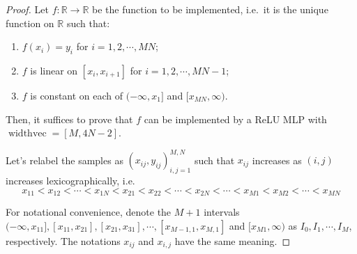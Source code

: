 \documentclass{article}
\numberwithin{equation}{section}
\theoremstyle{definition}
\begin{document}
\begin{proof}

Let $f:\mathbb{R}\rightarrow\mathbb{R}$ be the function to be implemented, i.e.\ it is the unique function on $\mathbb{R}$ such that:
\begin{enumerate}
    \item $f(x_i)=y_i$ for $i=1,2,\cdots,MN$;
    \item $f$ is linear on $[x_i,x_{i+1}]$ for $i=1,2,\cdots,MN-1$;
    \item $f$ is constant on each of $(-\infty,x_1]$ and $[x_{MN},\infty)$.
\end{enumerate}
Then, it suffices to prove that $f$ can be implemented by a ReLU MLP with $\operatorname{widthvec}=[M,4N-2]$.

Let's relabel the samples as $(x_{ij},y_{ij})_{i,j=1}^{M,N}$ such that $x_{ij}$ increases as $(i,j)$ increases lexicographically, i.e. 
\[
    x_{11} < x_{12} < \cdots < x_{1N}
    < 
    x_{21} < x_{22} < \cdots < x_{2N}
    < \cdots < 
    x_{M1} < x_{M2} < \cdots < x_{MN}
\]

For notational convenience, denote the $M+1$ intervals $(-\infty,x_{11}], [x_{11},x_{21}], [x_{21},x_{31}],\cdots,[x_{M-1,1},x_{M,1}]$ and $[x_{M1}, \infty)$ as $I_0,I_1,\cdots,I_M$, respectively. The notations $x_{ij}$ and $x_{i,j}$ have the same meaning. 


\end{proof}
\end{document}
